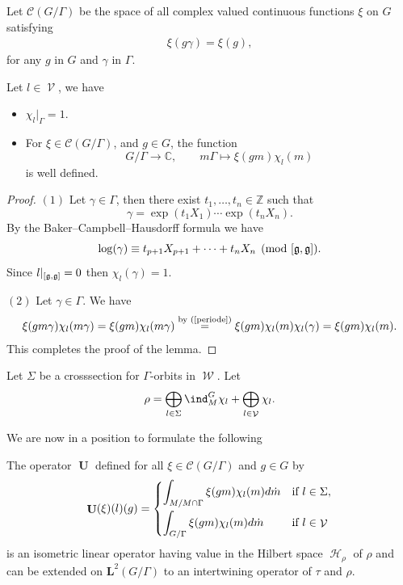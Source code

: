 \documentclass[pdftex]{sigma}
\DeclareMathOperator{\U}{\mathbf{U}}
\DeclareMathOperator{\nongen}{\mathcal{V}}
\DeclareMathOperator{\gen}{\mathcal{W}}
\DeclareMathOperator{\Hi}{\mathscr{H}}
\def\dsc{{\mathds C}}
\def\dsz{{\mathds Z}}
\begin{document}
Let $\mathcal{C}(G/\Gamma)$ be the space of all complex valued
continuous functions $\xi$ on $G$ satisfying
\begin{gather}\label{periode}
\xi(g\gamma)= \xi(g), \end{gather}
 for any $g$ in $G$ and $\gamma$
in $\Gamma$.




\begin{lemma}\label{periode2} Let $l\in \nongen$, we have
\begin{itemize}\itemsep=0pt
  \item[$(1)$] $\chi_l\vert_{\Gamma}=1$.
  \item[$(2)$] For $\xi \in \mathcal{C}(G/\Gamma)$, and $g\in G$, the function
\[
G/\Gamma\rightarrow \dsc,\qquad m\Gamma\mapsto \xi(gm)
\chi_l(m)
\]
is well defined.
\end{itemize}
\end{lemma}

\begin{proof} $(1)$ Let $\gamma\in \Gamma$, then there exist
$t_1, \ldots, t_n\in \dsz$ such that
\[
\gamma=\exp(t_1X_1)\cdots \exp(t_nX_n).
\]
By the Baker--Campbell--Hausdorf\/f formula we have
\[
\log(\gamma)\equiv t_{p+1}X_{p+1}+\cdots+t_n X_n\pmod{[\frak g,
\frak g]}.
\]
 Since $l\vert_{[\frak g, \frak g]}=0$ then $\chi_l(\gamma)=1$.


$(2)$ Let $\gamma\in \Gamma$. We have
\begin{gather*}
 \xi(gm\gamma)
\chi_l(m\gamma)
   = \xi(gm)
\chi_l(m\gamma) \overset{\text{by (\ref{periode})}}{=}    \xi(gm) \chi_l(m) \chi_l(\gamma)
 = \xi(gm) \chi_l(m).
\end{gather*}
 This completes the proof of the lemma.
\end{proof}

Let $\Sigma$ be a crosssection for $\Gamma$-orbits in $\gen$. Let
\begin{gather*}
 \rho =   \bigoplus_{l \in \Sigma}\ind_M^G\chi_l +
\bigoplus_{l\in \nongen} \chi_l.
\end{gather*}


We are now in a position  to formulate the following

\begin{theorem}\label{des-operator-special}
The operator  $\U$ defined for all  $\xi\in \mathcal{C}(G/\Gamma)$
and $g\in G$ by
 \begin{gather*}%
 \U(\xi)(l)(g) = \begin{cases}
\displaystyle     \int_{M/M\cap \Gamma} \xi(gm) \chi_l(m) d\dot{m} & \mbox{if }  l\in \Sigma,\vspace{1mm}\\
\displaystyle     \int_{G/ \Gamma} \xi(gm) \chi_l(m) d\dot{m} & \mbox{if }  l\in \nongen
    \end{cases}
\end{gather*}
 is an isometric linear operator having value in the Hilbert space
 $\Hi_\rho$ of $\rho$  and can be extended on
  $\mathbf{L}^2(G/\Gamma)$ to an
intertwining operator of $\tau$ and $\rho$.
\end{theorem}
\end{document}
